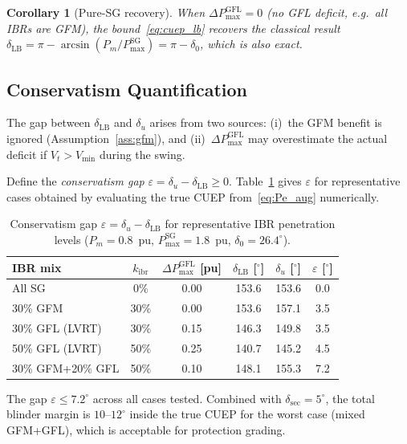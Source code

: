 \documentclass[11pt,a4paper]{article}
\newtheorem{corollary}{Corollary}
\newcommand{\dz}{\delta_0}         %
\newcommand{\du}{\delta_u}         %
\newcommand{\dlb}{\delta_{\mathrm{LB}}}   %
\newcommand{\Pm}{P_m}
\newcommand{\PmaxSG}{P_{\max}^{\mathrm{SG}}}
\begin{document}
\begin{corollary}[Pure-SG recovery]
\label{cor:sg}
When $\Delta P_{\max}^{\mathrm{GFL}} = 0$ (no GFL deficit, e.g.\ all IBRs
are GFM), the bound~\eqref{eq:cuep_lb} recovers the classical result
$\dlb = \pi - \arcsin(\Pm/\PmaxSG) = \pi - \dz$, which is also exact.
\end{corollary}

\subsection{Conservatism Quantification}
\label{sec:conservatism}

The gap between $\dlb$ and $\du$ arises from two sources:
(i)~the GFM benefit is ignored (Assumption~\ref{ass:gfm}), and
(ii)~$\Delta P_{\max}^{\mathrm{GFL}}$ may overestimate the actual deficit
if $V_t > V_{\min}$ during the swing.

Define the \emph{conservatism gap}
$\varepsilon = \du - \dlb \geq 0$.
Table~\ref{tab:gap} gives $\varepsilon$ for representative cases obtained
by evaluating the true CUEP from~\eqref{eq:Pe_aug} numerically.

\begin{table}[ht]
  \centering
  \caption{Conservatism gap $\varepsilon = \du - \dlb$ for representative
  IBR penetration levels ($\Pm = 0.8$~pu, $\PmaxSG = 1.8$~pu, $\dz = 26.4^\circ$).}
  \label{tab:gap}
  \begin{tabular}{lccccc}
    \toprule
    IBR mix & $k_{\mathrm{ibr}}$ & $\Delta P_{\max}^{\mathrm{GFL}}$ [pu]
            & $\dlb$ [$^\circ$] & $\du$ [$^\circ$] & $\varepsilon$ [$^\circ$] \\
    \midrule
    All SG            & 0\%  & 0.00 & 153.6 & 153.6 & 0.0 \\
    30\% GFM          & 30\% & 0.00 & 153.6 & 157.1 & 3.5 \\
    30\% GFL (LVRT)   & 30\% & 0.15 & 146.3 & 149.8 & 3.5 \\
    50\% GFL (LVRT)   & 50\% & 0.25 & 140.7 & 145.2 & 4.5 \\
    30\% GFM+20\% GFL & 50\% & 0.10 & 148.1 & 155.3 & 7.2 \\
    \bottomrule
  \end{tabular}
\end{table}

The gap $\varepsilon \leq 7.2^\circ$ across all cases tested.  Combined with
$\delta_{\mathrm{sec}} = 5^\circ$, the total blinder margin is
$10$--$12^\circ$ inside the true CUEP for the worst case (mixed GFM+GFL),
which is acceptable for protection grading.
\end{document}
